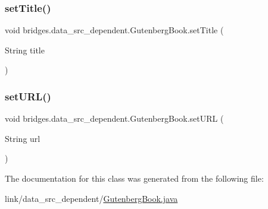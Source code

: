 \subsubsection{\texorpdfstring{set\+Title()}{setTitle()}}
{\footnotesize\ttfamily void bridges.\+data\+\_\+src\+\_\+dependent.\+Gutenberg\+Book.\+set\+Title (\begin{DoxyParamCaption}\item[{String}]{title }\end{DoxyParamCaption})}

\hypertarget{classbridges_1_1data__src__dependent_1_1_gutenberg_book_a9069f9c6835df30ccabf179158b9aa18}{}\label{classbridges_1_1data__src__dependent_1_1_gutenberg_book_a9069f9c6835df30ccabf179158b9aa18} 
\subsubsection{\texorpdfstring{set\+U\+R\+L()}{setURL()}}
{\footnotesize\ttfamily void bridges.\+data\+\_\+src\+\_\+dependent.\+Gutenberg\+Book.\+set\+U\+RL (\begin{DoxyParamCaption}\item[{String}]{url }\end{DoxyParamCaption})}



The documentation for this class was generated from the following file\+:\begin{DoxyCompactItemize}
\item 
link/data\+\_\+src\+\_\+dependent/\hyperlink{_gutenberg_book_8java}{Gutenberg\+Book.\+java}\end{DoxyCompactItemize}
